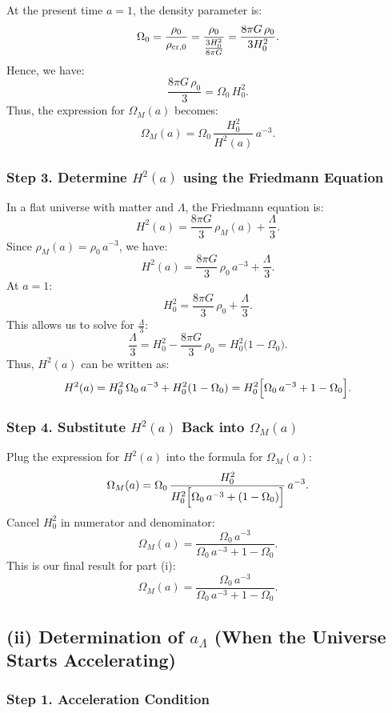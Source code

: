 \documentclass{article}
\begin{document}
At the present time \(a=1\), the density parameter is:
\[
\Omega_0 = \frac{\rho_0}{\rho_{\rm cr,0}} = \frac{\rho_0}{\frac{3H_0^2}{8\pi G}} = \frac{8\pi G\,\rho_0}{3H_0^2}.
\]
Hence, we have:
\[
\frac{8\pi G\,\rho_0}{3} = \Omega_0\,H_0^2.
\]
Thus, the expression for \(\Omega_M(a)\) becomes:
\[
\Omega_M(a) = \Omega_0\,\frac{H_0^2}{H^2(a)}\,a^{-3}.
\]

\subsubsection*{Step 3. Determine \(H^2(a)\) using the Friedmann Equation}

In a flat universe with matter and \(\Lambda\), the Friedmann equation is:
\[
H^2(a) = \frac{8\pi G}{3}\,\rho_M(a) + \frac{\Lambda}{3}.
\]
Since \(\rho_M(a)=\rho_0\,a^{-3}\), we have:
\[
H^2(a) = \frac{8\pi G}{3}\,\rho_0\,a^{-3} + \frac{\Lambda}{3}.
\]
At \(a=1\):
\[
H_0^2 = \frac{8\pi G}{3}\,\rho_0 + \frac{\Lambda}{3}.
\]
This allows us to solve for \(\frac{\Lambda}{3}\):
\[
\frac{\Lambda}{3} = H_0^2 - \frac{8\pi G}{3}\,\rho_0 = H_0^2\bigl(1-\Omega_0\bigr).
\]
Thus, \(H^2(a)\) can be written as:
\[
H^2(a) = H_0^2\,\Omega_0\,a^{-3} + H_0^2(1-\Omega_0)
= H_0^2\Bigl[\Omega_0\,a^{-3} + 1 - \Omega_0\Bigr].
\]

\subsubsection*{Step 4. Substitute \(H^2(a)\) Back into \(\Omega_M(a)\)}

Plug the expression for \(H^2(a)\) into the formula for \(\Omega_M(a)\):
\[
\Omega_M(a) = \Omega_0\,\frac{H_0^2}{H_0^2\Bigl[\Omega_0\,a^{-3} + (1-\Omega_0)\Bigr]}\,a^{-3}.
\]
Cancel \(H_0^2\) in numerator and denominator:
\[
\Omega_M(a)= \frac{\Omega_0\,a^{-3}}{\Omega_0\,a^{-3}+1-\Omega_0}.
\]
This is our final result for part (i):
\[
\boxed{\Omega_M(a) = \frac{\Omega_0\,a^{-3}}{\Omega_0\,a^{-3} + 1 - \Omega_0}.}
\]

\bigskip

\subsection*{(ii) Determination of \(a_\Lambda\) (When the Universe Starts Accelerating)}

\subsubsection*{Step 1. Acceleration Condition}
\end{document}
